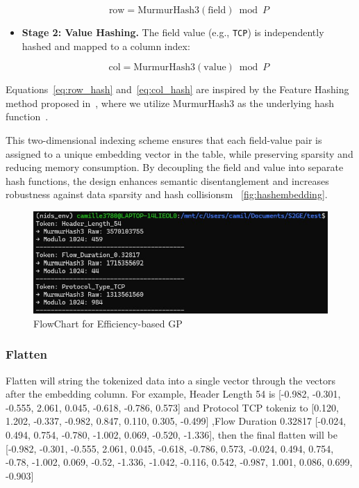 \begin{ZhChapter}
\begin{itemize}
          \begin{equation}
              \text{row} = \text{MurmurHash3}(\text{field}) \bmod P
              \label{eq:row_hash}
          \end{equation}

    \item \textbf{Stage 2: Value Hashing.} The field value (e.g., \texttt{TCP}) is independently hashed and mapped to a column index:

          \begin{equation}
              \text{col} = \text{MurmurHash3}(\text{value}) \bmod P
              \label{eq:col_hash}
          \end{equation}
\end{itemize}

Equations~\eqref{eq:row_hash} and~\eqref{eq:col_hash} are inspired by the Feature Hashing method proposed in~\cite{weinberger2009feature}, where we utilize MurmurHash3 as the underlying hash function~\cite{appleby2011murmurhash}.


This two-dimensional indexing scheme ensures that each field-value pair is assigned to a unique embedding vector in the table, while preserving sparsity and reducing memory consumption. By decoupling the field and value into separate hash functions, the design enhances semantic disentanglement and increases robustness against data sparsity and hash collisionsm ~\ref{fig:hashembedding}.


\begin{figure}[htbp]
    \centering
    \includegraphics[width = 1\textwidth]{image/2025-06-30 002218.jpg}
    \caption{FlowChart for Efficiency-based GP}
    \label{fig: hashembedding}
\end{figure}




\subsubsection{Flatten}
Flatten will string the tokenized data into a single vector through the vectors after the embedding column. For example, Header Length 54 is [-0.982, -0.301, -0.555,  2.061,  0.045, -0.618, -0.786,  0.573] and Protocol TCP tokeniz to [0.120,  1.202, -0.337, -0.982,  0.847,  0.110,  0.305, -0.499] ,Flow Duration 0.32817 [-0.024,  0.494,  0.754, -0.780, -1.002,  0.069, -0.520, -1.336], then the final flatten will be [-0.982, -0.301, -0.555, 2.061, 0.045, -0.618, -0.786, 0.573, -0.024, 0.494, 0.754, -0.78, -1.002, 0.069, -0.52, -1.336, -1.042, -0.116, 0.542, -0.987, 1.001, 0.086, 0.699, -0.903]



\end{ZhChapter}

